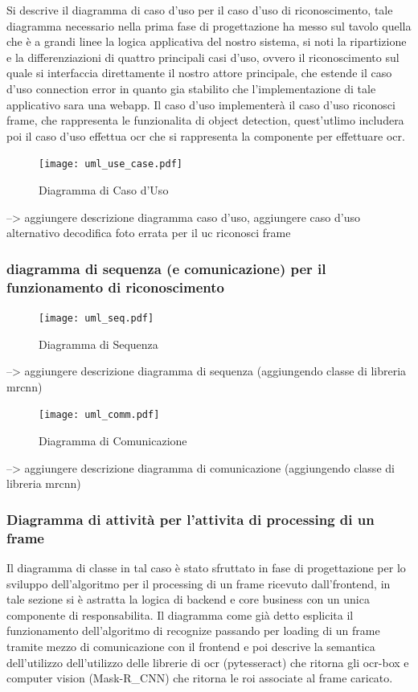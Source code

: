 \documentclass[12pt,a4paper]{article}
\newcommand{\mrcnn}{Mask-R\_CNN}
\begin{document}
Si descrive il diagramma di caso d'uso per il caso d'uso di
riconoscimento, tale diagramma necessario nella prima fase di
progettazione ha messo sul tavolo quella che è a grandi linee la logica
applicativa del nostro sistema, si noti la ripartizione e la
differenziazioni di quattro principali casi d'uso, ovvero il
riconoscimento sul quale si interfaccia direttamente il nostro attore
principale, che estende il caso d'uso connection error in quanto gia
stabilito che l'implementazione di tale applicativo sara una webapp.
Il caso d'uso implementerà il caso d'uso riconosci frame, che
rappresenta le funzionalita di object detection,
quest'utlimo includera poi il caso d'uso effettua ocr che si rappresenta
la componente per effettuare ocr.

\begin{figure}[p]
    \caption{Diagramma di Caso d'Uso}
    \centering
    \texttt{[image: uml\_use\_case.pdf]}
\end{figure}

--> aggiungere descrizione diagramma caso d'uso, aggiungere caso d'uso
alternativo decodifica foto errata per il uc riconosci frame

\subsubsection{diagramma di sequenza (e comunicazione) per il
funzionamento di riconoscimento}

\begin{figure}[p]
    \caption{Diagramma di Sequenza}
    \centering
    \texttt{[image: uml\_seq.pdf]}
\end{figure}

--> aggiungere descrizione diagramma di sequenza (aggiungendo classe di libreria mrcnn)

\begin{figure}[p]
    \caption{Diagramma di Comunicazione}
    \centering
    \texttt{[image: uml\_comm.pdf]}
\end{figure}

--> aggiungere descrizione diagramma di comunicazione (aggiungendo classe di libreria mrcnn)

\subsubsection{Diagramma di attività per l'attivita di processing di un
frame}

Il diagramma di classe in tal caso è stato sfruttato in fase di
progettazione per lo sviluppo dell'algoritmo per il processing di un
frame ricevuto dall'frontend, in tale sezione si è astratta la logica di
backend e core business con un unica componente di responsabilita.
Il diagramma come già detto esplicita il funzionamento dell'algoritmo di
recognize passando per loading di un frame tramite mezzo di
comunicazione  con il frontend e poi descrive la semantica dell'utilizzo
dell'utilizzo delle librerie di ocr (pytesseract) che ritorna gli
ocr-box e computer vision (\mrcnn) che ritorna le roi associate al frame
caricato.
\end{document}
